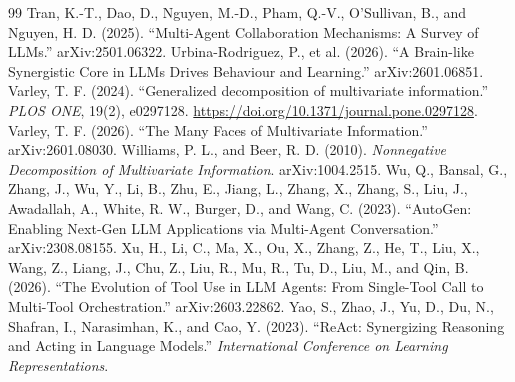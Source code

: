 \documentclass[12pt,a4paper,oneside]{report}
\begin{document}
\begin{thebibliography}{99}
 Tran, K.-T., Dao, D., Nguyen, M.-D., Pham, Q.-V., O’Sullivan, B., and Nguyen, H. D. (2025). “Multi-Agent Collaboration Mechanisms: A Survey of LLMs.” arXiv:2501.06322.
 Urbina-Rodriguez, P., et al. (2026). “A Brain-like Synergistic Core in LLMs Drives Behaviour and Learning.” arXiv:2601.06851.
 Varley, T. F. (2024). “Generalized decomposition of multivariate information.” \emph{PLOS ONE}, 19(2), e0297128. \url{https://doi.org/10.1371/journal.pone.0297128}.
 Varley, T. F. (2026). “The Many Faces of Multivariate Information.” arXiv:2601.08030.
 Williams, P. L., and Beer, R. D. (2010). \emph{Nonnegative Decomposition of Multivariate Information}. arXiv:1004.2515.
 Wu, Q., Bansal, G., Zhang, J., Wu, Y., Li, B., Zhu, E., Jiang, L., Zhang, X., Zhang, S., Liu, J., Awadallah, A., White, R. W., Burger, D., and Wang, C. (2023). “AutoGen: Enabling Next-Gen LLM Applications via Multi-Agent Conversation.” arXiv:2308.08155.
 Xu, H., Li, C., Ma, X., Ou, X., Zhang, Z., He, T., Liu, X., Wang, Z., Liang, J., Chu, Z., Liu, R., Mu, R., Tu, D., Liu, M., and Qin, B. (2026). “The Evolution of Tool Use in LLM Agents: From Single-Tool Call to Multi-Tool Orchestration.” arXiv:2603.22862.
 Yao, S., Zhao, J., Yu, D., Du, N., Shafran, I., Narasimhan, K., and Cao, Y. (2023). “ReAct: Synergizing Reasoning and Acting in Language Models.” \emph{International Conference on Learning Representations}.
\end{thebibliography}
\end{document}
